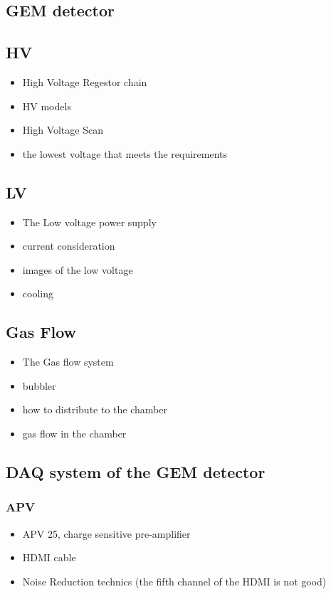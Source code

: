 \subsection{GEM detector}
\subsection{HV}

\begin{itemize}
    \item High Voltage Regestor chain 
    \item HV models 
    \item High Voltage Scan
    \item the lowest voltage that meets the requirements
\end{itemize}

\subsection{LV}

\begin{itemize}
    \item The Low voltage power supply
    \item current consideration 
    \item images of the low voltage
    \item cooling 
\end{itemize}

\subsection{Gas Flow}

    \begin{itemize}
        \item The Gas flow system
        \item bubbler
        \item how to distribute to the chamber 
        \item gas flow in the chamber
    \end{itemize}

\subsection{DAQ system of the GEM detector}

\subsubsection{APV}
\begin{itemize}
    \item APV 25, charge sensitive pre-amplifier
    \item HDMI cable
    \item Noise Reduction technics (the fifth channel of the HDMI is not good)
\end{itemize}

